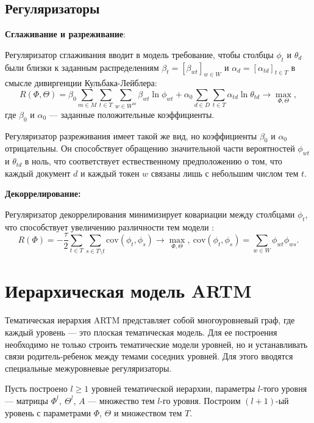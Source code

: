 \subsection{Регуляризаторы}
\textbf{Сглаживание и разреживание}:

Регуляризатор сглаживания вводит в модель требование, чтобы столбцы $\phi_{t}$ и $\theta_{d}$ были близки к заданным распределениям $\beta_t = [\beta_{wt}]_{w \in W}$ и $\alpha_d = [\alpha_{td}]_{t \in T}$ в смысле дивиргенции Кульбака-Лейблера\cite{ARTM4}:
$$R(\Phi, \Theta) = \beta_0\sum_{m\in M} \sum_{t\in T}\sum_{w \in W^m} \beta_{wt}\ln \phi_{wt} + \alpha_0 \sum_{d\in D} \sum_{t\in T}\alpha_{td} \ln \theta_{td} \rightarrow 
\max\limits_{\Phi, \Theta},$$
где $\beta_0$ и $\alpha_0$ --- заданные положительные коэффициенты.

Регуляризатор разреживания имеет такой же вид, но коэффициенты $\beta_0$ и $\alpha_0$ отрицательны. Он способствует обращению значительной части вероятностей $\phi_{wt}$ и $\theta_{td}$ в ноль, что соответствует ествественному предположению о том, что каждый документ $d$ и каждый токен $w$ связаны лишь с небольшим числом тем $t$.


\textbf{Декоррелирование:}

Регуляризатор декоррелирования минимизирует ковариации между столбцами $\phi_{t}$, что способствует увеличению различности тем модели \cite{ARTM4}:
$$ R(\Phi) = -\dfrac{\tau}{2}\sum_{t \in T}\sum_{s \in T\setminus t} \text{cov}(\phi_t, \phi_s) \rightarrow 
\max\limits_{\Phi, \Theta}, \  \text{cov}(\phi_t, \phi_s) = \sum_{w \in W}\phi_{wt}\phi_{ws}.$$


\section{Иерархическая модель ARTM}

Тематическая иерархия ARTM представляет собой многоуровневый граф, где каждый уровень --- это плоская тематическая модель.
Для ее построения необходимо не только строить тематические модели уровней, но и устанавливать связи родитель-ребенок между темами соседних уровней. Для этого вводятся специальные межуровневые регуляризаторы. 

Пусть построено $l \geq 1$ уровней тематической иерархии, параметры $l$-того уровня --- матрицы $\Phi^l, \ \Theta^l$, $A$ --- множество тем $l$-го уровня. Построим $(l+1)$-ый уровень с параметрами $\Phi$, $\Theta$ и множеством тем $T$.

